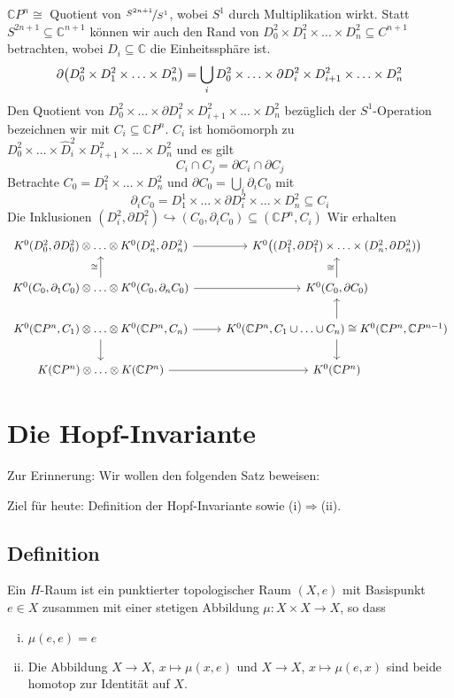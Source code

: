 $\mathds{C}P^n \cong$ Quotient von $\nicefrac{S^{2n+1}}{S^1}$, wobei $S^1$ durch Multiplikation wirkt. Statt $S^{2n+1} \subseteq \mathds{C}^{n+1}$ können wir auch den Rand
von $D_0^2 \times D_1^2 \times \ldots \times D_n^2 \subseteq C^{n+1}$ betrachten, wobei $D_i \subseteq \mathds{C}$ die Einheitssphäre ist.
\[
	\partial \enbrace*{D_0^2 \times D_1^2 \times \ldots \times D_n^2} = \bigcup_i D_0^2 \times \ldots \times \partial D_i^2 \times D_{i+1}^2 \times \ldots \times D_n^2 
\]
Den Quotient von $D_0^2 \times \ldots \times \partial D_i^2 \times D_{i+1}^2 \times \ldots \times D_n^2 $ bezüglich der $S^1$-Operation bezeichnen wir mit 
$C_i \subseteq \mathds{C}P^n$. $C_i$ ist homöomorph zu $D_0^2 \times \ldots \times \hat{D}_i^2 \times D_{i+1}^2 \times \ldots \times D_n^2 $ und es gilt
\[
	C_i \cap C_j = \partial C_i \cap \partial C_j
\]
Betrachte $C_0 = D_1^2 \times \ldots \times D_n^2$ und $\partial C_0 = \bigcup_i \partial_i C_0$ mit 
\[
	\partial_i C_0 = D_1^1 \times \ldots \times \partial D_i^2 \times \ldots \times D_n^2 \subseteq C_i
\]
Die Inklusionen $(D_i^2,\partial D_i^2) \hookrightarrow (C_0,\partial_i C_0) \subseteq (\mathds{C}P^n,C_i)$ Wir erhalten 
\[
	\begin{tikzcd}
			K^0(D^2_0,\partial D_0^2) \otimes  \ldots \otimes K^0(D_n^2,\partial D_n^2) \rar 
			& K^0 \enbrace*{ (D_1^2,\partial D_1^2) \times \ldots \times (D_n^2, \partial D_n^2)} \\
			K^0(C_0,\partial_1 C_0) \otimes \ldots \otimes K^0(C_0,\partial_n C_0) \rar \uar["\cong"] & K^0(C_0,\partial C_0) \uar["\cong"] \\
			K^0(\mathds{C}P^n,C_1) \otimes \ldots \otimes K^0(\mathds{C}P^n,C_n) \rar \dar & K^0(\mathds{C}P^n, C_1 \cup \ldots \cup C_n) \cong 
			K^0(\mathds{C}P^n,\mathds{C}P^{n-1}) \dar \uar\\
			K(\mathds{C}P^n) \otimes \ldots \otimes K(\mathds{C}P^n) \rar & K^0(\mathds{C}P^n)
	\end{tikzcd}
\]
\newpage

\section{Die Hopf-Invariante} %
\label{sec:die_hopf_invariante}
Zur Erinnerung: Wir wollen den folgenden Satz beweisen:

\Adams*
Ziel für heute: Definition der Hopf-Invariante sowie (i)$\Rightarrow $(ii).


\subsection{Definition} %
\label{sub:41}
Ein $H$-Raum ist ein punktierter topologischer Raum $(X,e)$ mit Basispunkt $e \in X$ zusammen mit einer stetigen Abbildung $\mu \colon X \times X \to X$, so dass 
\begin{enumerate}[(i)]
	\item $\mu(e,e)=e$
	\item Die Abbildung $X \to X$, $x \mapsto \mu(x,e)$ und $X \to X$, $x \mapsto \mu(e,x)$ sind beide homotop zur Identität auf $X$.
\end{enumerate}

